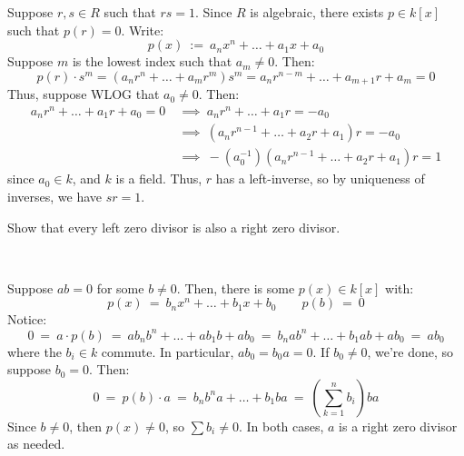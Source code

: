 \begin{pf}
	Suppose $r,s \in R$ such that $rs =1$.
	Since $R$ is algebraic, there exists $p\in k[x]$ such that $p(r)=0$. Write:
	\begin{equation*}
	    p(x) \ := \ a_{n}x^{n}+\dots +a_{1}x+a_{0}
	\end{equation*}
	Suppose $m$ is the lowest index such that $a_{m}\neq 0$. Then:
	\begin{equation*}
		p(r)\cdot s^{m} = (a_{n}r^{n}+\dots +a_{m}r^{m})s^{m}
		= a_{n}r^{n-m}+\dots +a_{m+1}r+a_{m}=0
	\end{equation*}
	Thus, suppose WLOG that $a_{0}\neq0$. Then:
	\begin{align*}
	    a_{n}r^{n}+\dots +a_{1}r+a_{0} = 0
		& \ \implies \ a_{n}r^{n}+\dots +a_{1}r = -a_{0} \\
		& \ \implies \ (a_{n}r^{n-1}+\dots +a_{2}r+a_{1})r=-a_{0} \\
		& \ \implies \ -(a_{0}^{-1})
		\left(a_{n}r^{n-1}+\dots +a_{2}r+a_{1}\right)r = 1
	\end{align*}
	since $a_{0}\in k$, and $k$ is a field.
	Thus, $r$ has a left-inverse, so by uniqueness of inverses, we have
	$sr=1$.
\end{pf}

\newpage
\begin{exr}[title=Exercise 1.13 part c)]
	Show that every left zero divisor is also a right zero divisor.
\end{exr} \

\begin{pf}
	Suppose $ab=0$ for some $b\neq0$.
	Then, there is some $p(x)\in k[x]$ with:
	\begin{equation*}
		p(x) \ = \ b_{n}x^{n} + \dots + b_{1}x + b_{0} \qquad p(b) \ = \ 0
	\end{equation*}
	Notice:
	\begin{equation*}
		0 \ = \ a\cdot p(b) \ = \ ab_{n}b^{n} + \dots + ab_{1}b + ab_{0}
		\ = \ b_{n}ab^{n} + \dots + b_{1}ab + ab_{0} \ = \ ab_{0}
	\end{equation*}
	where the $b_{i}\in k$ commute.
	In particular, $ab_{0}=b_{0}a=0$.
	If $b_{0}\neq0$, we're done, so suppose $b_{0}=0$. Then:
	\begin{equation*}
		0 \ = \ p(b)\cdot a \ = \ b_{n}b^{n}a + \dots + b_{1}ba
		\ = \ \left(\sum_{k=1}^{n}b_{i}\right)ba
	\end{equation*}
	Since $b\neq0$, then $p(x)\neq0$, so $\sum b_{i}\neq0$.
	In both cases, $a$ is a right zero divisor as needed.
\end{pf} \

